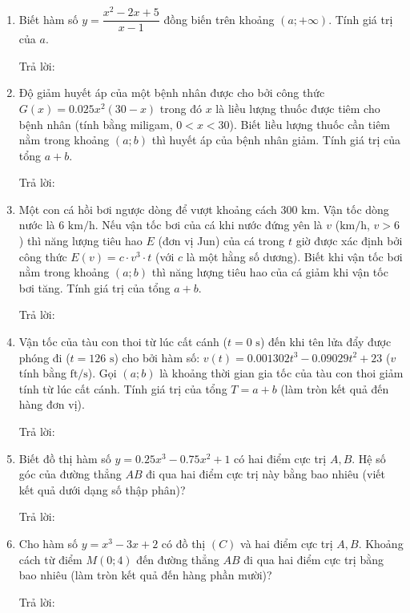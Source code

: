 \documentclass[12pt]{article}
\newcommand{\otraloi}{\underline{\hspace{5cm}}}
\begin{document}
	\begin{enumerate}[label=\textbf{Câu \arabic*.}]
		
		\item Biết hàm số $y = \dfrac{x^2 - 2x + 5}{x - 1}$ đồng biến trên khoảng $(a; +\infty)$. Tính giá trị của $a$.
		\par Trả lời: \otraloi
		
		\item Độ giảm huyết áp của một bệnh nhân được cho bởi công thức $G(x) = 0.025x^2(30 - x)$ trong đó $x$ là liều lượng thuốc được tiêm cho bệnh nhân (tính bằng miligam, $0 < x < 30$). Biết liều lượng thuốc cần tiêm nằm trong khoảng $(a; b)$ thì huyết áp của bệnh nhân giảm. Tính giá trị của tổng $a+b$.
		\par Trả lời: \otraloi
		
		\item Một con cá hồi bơi ngược dòng để vượt khoảng cách $300\text{ km}$. Vận tốc dòng nước là $6\text{ km/h}$. Nếu vận tốc bơi của cá khi nước đứng yên là $v$ ($\text{km/h}$, $v > 6$) thì năng lượng tiêu hao $E$ (đơn vị Jun) của cá trong $t$ giờ được xác định bởi công thức $E(v) = c \cdot v^3 \cdot t$ (với $c$ là một hằng số dương). Biết khi vận tốc bơi nằm trong khoảng $(a; b)$ thì năng lượng tiêu hao của cá giảm khi vận tốc bơi tăng. Tính giá trị của tổng $a+b$.
		\par Trả lời: \otraloi
		
		\item Vận tốc của tàu con thoi từ lúc cất cánh ($t=0\text{ s}$) đến khi tên lửa đẩy được phóng đi ($t = 126\text{ s}$) cho bởi hàm số: $v(t) = 0.001302t^3 - 0.09029t^2 + 23$ ($v$ tính bằng $\text{ft/s}$). Gọi $(a; b)$ là khoảng thời gian gia tốc của tàu con thoi giảm tính từ lúc cất cánh. Tính giá trị của tổng $T = a + b$ (làm tròn kết quả đến hàng đơn vị).
		\par Trả lời: \otraloi
		
		\item Biết đồ thị hàm số $y = 0.25x^3 - 0.75x^2 + 1$ có hai điểm cực trị $A, B$. Hệ số góc của đường thẳng $AB$ đi qua hai điểm cực trị này bằng bao nhiêu (viết kết quả dưới dạng số thập phân)?
		\par Trả lời: \otraloi
		
		\item Cho hàm số $y = x^3 - 3x + 2$ có đồ thị $(C)$ và hai điểm cực trị $A, B$. Khoảng cách từ điểm $M(0; 4)$ đến đường thẳng $AB$ đi qua hai điểm cực trị bằng bao nhiêu (làm tròn kết quả đến hàng phần mười)?
		\par Trả lời: \otraloi
		

\end{enumerate}
\end{document}
